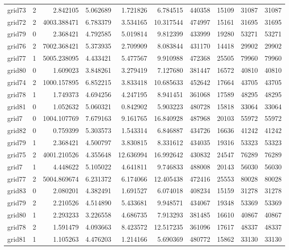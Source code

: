 \begin{longtable}{|l|r|r|r|r|r|r|r|r|r|}
grid73 & 2 & 2.842105 & 5.062689 & 1.721826 & 6.784515 & 440358 & 15109 & 31087 & 31087 \\
grid72 & 2 & 4003.388471 & 6.783379 & 3.534165 & 10.317544 & 474997 & 15161 & 31695 & 31695 \\
grid79 & 0 & 2.368421 & 4.792585 & 5.019814 & 9.812399 & 433999 & 19280 & 53271 & 53271 \\
grid76 & 2 & 7002.368421 & 5.373935 & 2.709909 & 8.083844 & 431170 & 14418 & 29902 & 29902 \\
grid77 & 1 & 5005.238095 & 4.433421 & 5.477567 & 9.910988 & 472368 & 25505 & 79960 & 79960 \\
grid80 & 0 & 1.609023 & 3.848261 & 3.279419 & 7.127680 & 381447 & 16572 & 40810 & 40810 \\
grid74 & 2 & 1000.157895 & 6.852215 & 3.833418 & 10.685633 & 452642 & 17664 & 43705 & 43705 \\
grid78 & 1 & 1.749373 & 4.694256 & 4.247195 & 8.941451 & 361068 & 17589 & 48295 & 48295 \\
grid81 & 0 & 1.052632 & 5.060321 & 0.842902 & 5.903223 & 480728 & 15818 & 33064 & 33064 \\
grid7 & 0 & 1004.107769 & 7.679163 & 9.161765 & 16.840928 & 487968 & 20103 & 55972 & 55972 \\
grid82 & 0 & 0.759399 & 5.303573 & 1.543314 & 6.846887 & 434726 & 16636 & 41242 & 41242 \\
grid79 & 1 & 2.368421 & 4.500797 & 3.830815 & 8.331612 & 434035 & 19316 & 53323 & 53323 \\
grid75 & 2 & 4001.210526 & 4.355648 & 12.636994 & 16.992642 & 430832 & 24547 & 76289 & 76289 \\
grid7 & 1 & 4.448622 & 5.105022 & 4.641811 & 9.746833 & 488008 & 20143 & 56030 & 56030 \\
grid77 & 2 & 5004.869674 & 6.231372 & 6.174066 & 12.405438 & 472416 & 25553 & 80028 & 80028 \\
grid83 & 0 & 2.080201 & 4.382491 & 1.691527 & 6.074018 & 408234 & 15159 & 31278 & 31278 \\
grid79 & 2 & 2.210526 & 4.514890 & 5.433681 & 9.948571 & 434067 & 19348 & 53369 & 53369 \\
grid80 & 1 & 2.293233 & 3.226558 & 4.686735 & 7.913293 & 381485 & 16610 & 40867 & 40867 \\
grid78 & 2 & 1.591479 & 4.093663 & 8.423572 & 12.517235 & 361096 & 17617 & 48337 & 48337 \\
grid81 & 1 & 1.105263 & 4.476203 & 1.214166 & 5.690369 & 480772 & 15862 & 33130 & 33130 \\

\end{longtable}
